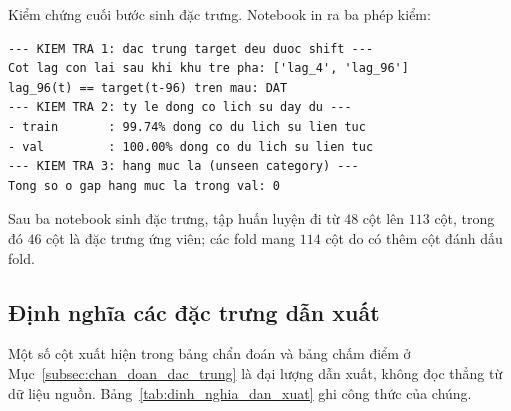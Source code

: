 \documentclass[12pt, a4paper]{report}
\begin{document}
Kiểm chứng cuối bước sinh đặc trưng. Notebook in ra ba phép kiểm:

\begingroup
\par{}\vspace{8pt}
\small\renewcommand{\baselinestretch}{1.0}\selectfont
\begin{verbatim}
--- KIEM TRA 1: dac trung target deu duoc shift ---
Cot lag con lai sau khi khu tre pha: ['lag_4', 'lag_96']
lag_96(t) == target(t-96) tren mau: DAT
--- KIEM TRA 2: ty le dong co lich su day du ---
- train       : 99.74% dong co du lich su lien tuc
- val         : 100.00% dong co du lich su lien tuc
--- KIEM TRA 3: hang muc la (unseen category) ---
Tong so o gap hang muc la trong val: 0
\end{verbatim}
\par\vspace{8pt}
\endgroup
Sau ba notebook sinh đặc trưng, tập huấn luyện đi từ $48$ cột lên $113$ cột, trong đó $46$
cột là đặc trưng ứng viên; các fold mang $114$ cột do có thêm cột đánh dấu fold.

\FloatBarrier
\subsection{Định nghĩa các đặc trưng dẫn xuất}

Một số cột xuất hiện trong bảng chẩn đoán và bảng chấm điểm ở Mục~\ref{subsec:chan_doan_dac_trung} là đại lượng dẫn xuất,
không đọc thẳng từ dữ liệu nguồn. Bảng~\ref{tab:dinh_nghia_dan_xuat} ghi công thức của chúng.
\end{document}
